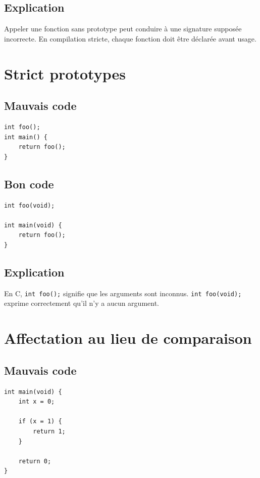 \documentclass[a4paper,11pt]{report}
\begin{document}
\section{Explication}
Appeler une fonction sans prototype peut conduire à une signature supposée incorrecte.
En compilation stricte, chaque fonction doit être déclarée avant usage.

\chapter{Strict prototypes}

\section{Mauvais code}
\begin{lstlisting}
int foo();
int main() {
    return foo();
}
\end{lstlisting}

\section{Bon code}
\begin{lstlisting}
int foo(void);

int main(void) {
    return foo();
}
\end{lstlisting}

\section{Explication}
En C, \texttt{int foo();} signifie que les arguments sont inconnus.
\texttt{int foo(void);} exprime correctement qu'il n'y a aucun argument.

\chapter{Affectation au lieu de comparaison}

\section{Mauvais code}
\begin{lstlisting}
int main(void) {
    int x = 0;

    if (x = 1) {
        return 1;
    }

    return 0;
}
\end{lstlisting}
\end{document}
